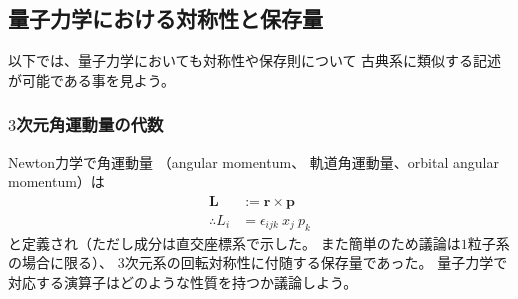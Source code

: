\subsection{量子力学における対称性と保存量}

以下では、量子力学においても対称性や保存則について
古典系に類似する記述が可能である事を見よう。

\subsubsection{$3$次元角運動量の代数}
\label{subsubsec: angular momentum}

Newton力学で角運動量
（angular momentum、
軌道角運動量、orbital angular momentum）は
\begin{subequations}
\begin{align}
    \bm{L} &:= \bm{r} \times \bm{p}
    \\\therefore
    L_i &= \epsilon_{ijk} \ x_j \ p_k
\label{angular momentum definition}
\end{align}
\end{subequations}
と定義され（ただし成分は直交座標系で示した。
また簡単のため議論は$1$粒子系の場合に限る）、
3次元系の回転対称性に付随する保存量であった。
量子力学で対応する演算子はどのような性質を持つか議論しよう。

